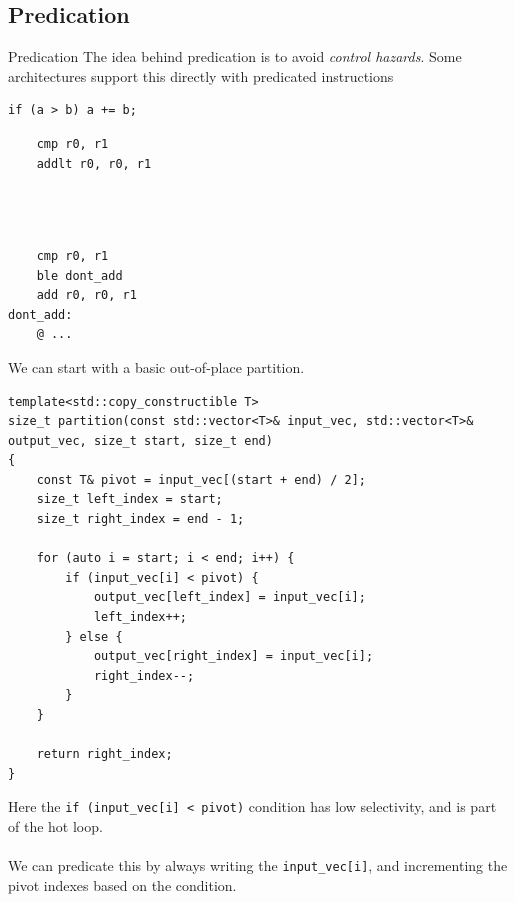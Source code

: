 \subsection{Predication}
\begin{sidenotebox}{Predication}
    The idea behind predication is to avoid \textit{control hazards}.
    Some architectures support this directly with predicated instructions
    \begin{minipage}[t]{.3\textwidth}
        \begin{verbatim}
if (a > b) a += b;
        \end{verbatim}
    \end{minipage} \hfill \begin{minipage}[t]{.2\textwidth}
        \begin{verbatim}
    cmp r0, r1
    addlt r0, r0, r1


    
        \end{verbatim}
    \end{minipage} \hfill\begin{minipage}[t]{.2\textwidth}
        \begin{verbatim}
    cmp r0, r1
    ble dont_add 
    add r0, r0, r1
dont_add:
    @ ...
        \end{verbatim}
    \end{minipage}
\end{sidenotebox}
We can start with a basic out-of-place partition.
\begin{verbatim}
template<std::copy_constructible T>
size_t partition(const std::vector<T>& input_vec, std::vector<T>& output_vec, size_t start, size_t end)
{
    const T& pivot = input_vec[(start + end) / 2];  
    size_t left_index = start;
    size_t right_index = end - 1;

    for (auto i = start; i < end; i++) {
        if (input_vec[i] < pivot) {
            output_vec[left_index] = input_vec[i];
            left_index++;
        } else {
            output_vec[right_index] = input_vec[i];
            right_index--;
        }
    }

    return right_index;
}
\end{verbatim}
Here the \texttt{if (input_vec[i] < pivot)} condition has low selectivity, and is part of the hot loop.
\\
\\ We can predicate this by always writing the \texttt{input_vec[i]}, and incrementing the pivot indexes based on the condition.
